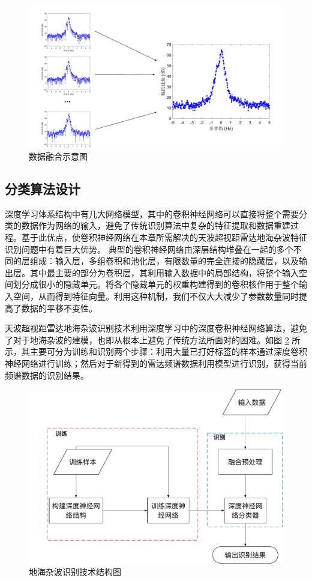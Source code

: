 \begin{figure}[H]
	\centering
	\includegraphics[width=\textwidth]{figures/othr/spectrum_fusion}
	\caption{数据融合示意图}
	\label{fig:spectrum_fusion}
\end{figure}

\subsection{分类算法设计}
深度学习体系结构中有几大网络模型，其中的卷积神经网络可以直接将整个需要分类的数据作为网络的输入，避免了传统识别算法中复杂的特征提取和数据重建过程。基于此优点，使卷积神经网络在本章所需解决的天波超视距雷达地海杂波特征识别问题中有着巨大优势。
典型的卷积神经网络由深层结构堆叠在一起的多个不同的层组成：输入层，多组卷积和池化层，有限数量的完全连接的隐藏层，以及输出层。其中最主要的部分为卷积层，其利用输入数据中的局部结构，将整个输入空间划分成很小的隐藏单元。将各个隐藏单元的权重构建得到的卷积核作用于整个输入空间，从而得到特征向量。利用这种机制，我们不仅大大减少了参数数量同时提高了数据的平移不变性。

天波超视距雷达地海杂波识别技术利用深度学习中的深度卷积神经网络算法，避免了对于地海杂波的建模，也即从根本上避免了传统方法所面对的困难。如图 \ref{fig:othr_tech} 所示，其主要可分为训练和识别两个步骤：利用大量已打好标签的样本通过深度卷积神经网络进行训练；然后对于新得到的雷达频谱数据利用模型进行识别，获得当前频谱数据的识别结果。

\begin{figure}[H]
	\centering
	\includegraphics[width=\textwidth]{figures/othr/othr_tech}
	\caption{地海杂波识别技术结构图}
	\label{fig:othr_tech}
\end{figure}


